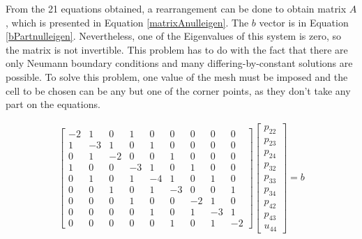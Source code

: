 \documentclass[journal]{IEEEtran}
\begin{document}
From the 21 equations obtained, a rearrangement can be done to obtain matrix $A$, which is presented in Equation \ref{matrixAnulleigen}. The $b$ vector is in Equation \ref{bPartnulleigen}. Nevertheless, one of the Eigenvalues of this system is zero, so the matrix is not invertible. This problem has to do with the fact that there are only Neumann boundary conditions and many differing-by-constant solutions are possible. To solve this problem, one value of the mesh must be imposed and the cell to be chosen can be any but one of the corner points, as they don't take any part on the equations. 

\begin{eqnarray}
\left[\begin{array}{ccccccccc}
-2 & 1 & 0 & 1 & 0 & 0 & 0 & 0 & 0\\
1 & -3 & 1 & 0 & 1 & 0 & 0 & 0 & 0\\
0 & 1 & -2 & 0 & 0 & 1 & 0 & 0 & 0\\
1 & 0 & 0 & -3 & 1 & 0 & 1 & 0 & 0\\
0 & 1 & 0 & 1 & -4 & 1 & 0 & 1 & 0\\
0 & 0 & 1 & 0 & 1 & -3 & 0 & 0 & 1\\
0 & 0 & 0 & 1 & 0 & 0 & -2 & 1 & 0\\
0 & 0 & 0 & 0 & 1 & 0 & 1 & -3 & 1\\
0 & 0 & 0 & 0 & 0 & 1 & 0 & 1 & -2 
\end{array}\right] \left[\begin{array}{c}
p_{22}\\ p_{23}\\ p_{24}	\\ p_{32}\\ p_{33}\\ p_{34}\\ p_{42}\\p_{43} \\u_{44}
\end{array}\right] = b \label{matrixAnulleigen}
\end{eqnarray}
\end{document}
